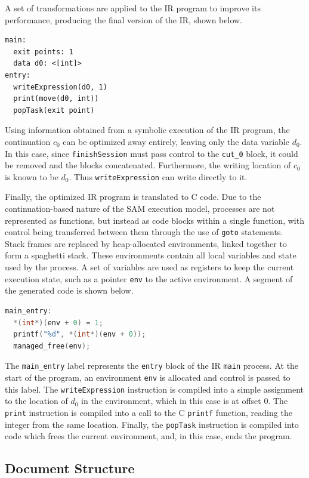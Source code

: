 \documentclass[sigconf,nonacm,natbib=true]{acmart}
\begin{document}
A set of transformations are applied to the \ac{IR} program to improve its performance, producing the final version of the \ac{IR}, shown below.
\begin{lstlisting}[language=IR]
main:
  exit points: 1
  data d0: <[int]>
entry:
  writeExpression(d0, 1)
  print(move(d0, int))
  popTask(exit point)
\end{lstlisting}
Using information obtained from a symbolic execution of the \ac{IR} program, the continuation $c_0$ can be optimized away entirely, leaving only the data variable $d_0$. In this case, since \texttt{finishSession} must pass control to the \texttt{cut\_0} block, it could be removed and the blocks concatenated. Furthermore, the writing location of $c_0$ is known to be $d_0$. Thus \texttt{writeExpression} can write directly to it.

Finally, the optimized \ac{IR} program is translated to C code. Due to the continuation-based nature of the \ac{SAM} execution model, processes are not represented as functions, but instead as code blocks within a single function, with control being transferred between them through the use of \texttt{goto} statements. Stack frames are replaced by heap-allocated environments, linked together to form a spaghetti stack. These environments contain all local variables and state used by the process. A set of variables are used as registers to keep the current execution state, such as a pointer \texttt{env} to the active environment. A segment of the generated code is shown below.
\begin{lstlisting}[language=C]
main_entry:
  *(int*)(env + 0) = 1;
  printf("%d", *(int*)(env + 0));
  managed_free(env);
\end{lstlisting}
The \texttt{main\_entry} label represents the \texttt{entry} block of the \ac{IR} \texttt{main} process. At the start of the program, an environment \texttt{env} is allocated and control is passed to this label. The \texttt{writeExpression} instruction is compiled into a simple assignment to the location of $d_0$ in the environment, which in this case is at offset $0$. The \texttt{print} instruction is compiled into a call to the C \texttt{printf} function, reading the integer from the same location. Finally, the \texttt{popTask} instruction is compiled into code which frees the current environment, and, in this case, ends the program.

\subsection{Document Structure}
\end{document}
